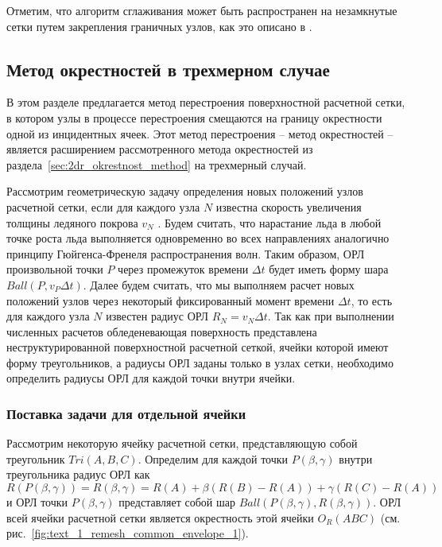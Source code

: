 Отметим, что алгоритм сглаживания может быть распространен на незамкнутые сетки путем закрепления граничных узлов, как это описано в \cite{Shumilin2021Smooth}.


\subsection{Метод окрестностей в трехмерном случае}

В этом разделе предлагается метод перестроения поверхностной расчетной сетки, в котором узлы в процессе перестроения смещаются на границу окрестности одной из инцидентных ячеек.
Этот метод перестроения -- метод окрестностей -- является расширением рассмотренного метода окрестностей из раздела~\ref{sec:2dr_okrestnost_method} на трехмерный случай.

Рассмотрим геометрическую задачу определения новых положений узлов расчетной сетки, если для каждого узла $N$ известна скорость увеличения толщины ледяного покрова $v_N$ \cite{Rybakov2023GeoRemesh}.
Будем считать, что нарастание льда в любой точке роста льда выполняется одновременно во всех направлениях аналогично принципу Гюйгенса-Френеля распространения волн.
Таким образом, ОРЛ произвольной точки $P$ через промежуток времени $\Delta t$ будет иметь форму шара $Ball(P, v_P \Delta t)$.
Далее будем считать, что мы выполняем расчет новых положений узлов через некоторый фиксированный момент времени $\Delta t$, то есть для каждого узла $N$ известен радиус ОРЛ $R_N = v_N \Delta t$.
Так как при выполнении численных расчетов обледеневающая поверхность представлена неструктурированной поверхностной расчетной сеткой, ячейки которой имеют форму треугольников, а радиусы ОРЛ заданы только в узлах сетки, необходимо определить радиусы ОРЛ для каждой точки внутри ячейки.

\subsubsection{Поставка задачи для отдельной ячейки}

Рассмотрим некоторую ячейку расчетной сетки, представляющую собой треугольник $Tri(A, B, C)$.
Определим для каждой точки $P(\beta,\gamma)$ внутри треугольника радиус ОРЛ как
\begin{equation}
	R(P(\beta,\gamma)) = R(\beta,\gamma) = R(A) + \beta(R(B) - R(A)) + \gamma(R(C) - R(A))
\end{equation}
и ОРЛ точки $P(\beta,\gamma)$ представляет собой шар $Ball(P(\beta,\gamma), R(\beta,\gamma))$.
ОРЛ всей ячейки расчетной сетки является окрестность этой ячейки $O_R(ABC)$ (см. рис.~\ref{fig:text_1_remesh_common_envelope_1}).

